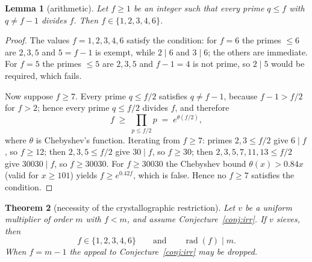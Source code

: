 \documentclass[11pt,a4paper]{article}
\theoremstyle{plain}
\newtheorem{theorem}{Theorem}[section]
\newtheorem{lemma}[theorem]{Lemma}
\theoremstyle{definition}
\theoremstyle{remark}
\newcommand{\rad}{\operatorname{rad}}
\begin{document}
\begin{lemma}[arithmetic]\label{lem:arith}
Let $f\ge1$ be an integer such that every prime $q\le f$ with $q\ne f-1$ divides $f$. Then
$f\in\{1,2,3,4,6\}$.
\end{lemma}

\begin{proof}
The values $f=1,2,3,4,6$ satisfy the condition: for $f=6$ the primes $\le6$ are $2,3,5$ and
$5=f-1$ is exempt, while $2\mid6$ and $3\mid6$; the others are immediate. For $f=5$ the
primes $\le5$ are $2,3,5$ and $f-1=4$ is not prime, so $2\mid5$ would be required, which
fails.

Now suppose $f\ge7$. Every prime $q\le f/2$ satisfies $q\ne f-1$, because $f-1>f/2$ for
$f>2$; hence every prime $q\le f/2$ divides $f$, and therefore
\[
  f\;\ge\;\prod_{p\le f/2}p\;=\;e^{\theta(f/2)},
\]
where $\theta$ is Chebyshev's function. Iterating from $f\ge7$: primes $2,3\le f/2$ give
$6\mid f$, so $f\ge12$; then $2,3,5\le f/2$ give $30\mid f$, so $f\ge30$; then
$2,3,5,7,11,13\le f/2$ give $30030\mid f$, so $f\ge30030$. For $f\ge30030$ the Chebyshev
bound $\theta(x)>0.84x$ (valid for $x\ge101$) yields $f\ge e^{0.42f}$, which is false. Hence
no $f\ge7$ satisfies the condition.
\end{proof}

\begin{theorem}[necessity of the crystallographic restriction]\label{thm:necessity}
Let $v$ be a uniform multiplier of order $m$ with $f<m$, and assume
Conjecture~\ref{conj:irr}. If $v$ sieves, then
\[
  f\in\{1,2,3,4,6\}\qquad\text{and}\qquad \rad(f)\mid m .
\]
When $f=m-1$ the appeal to Conjecture~\ref{conj:irr} may be dropped.
\end{theorem}
\end{document}
